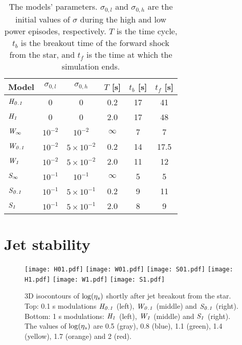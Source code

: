 \documentclass[fleqn,usenatbib]{mnras}
\newcommand{\Ha}{{\it H_{0.1}}}
\newcommand{\Hb}{{\it H_{1}}}
\newcommand{\Wa}{{\it W_{0.1}}}
\newcommand{\Wb}{{\it W_{1}}}
\newcommand{\Sa}{{\it S_{0.1}}}
\newcommand{\Sb}{{\it S_{1}}}
\newcommand{\Wc}{{\it W_{\infty}}}
\newcommand{\Sc}{{\it S_{\infty}}}
\newcommand{\sigl}{{\sigma_{0,l}}}
\newcommand{\sigh}{{\sigma_{0,h}}}
\begin{document}
	\begin{table}
		\setlength{\tabcolsep}{10.5pt}
		\centering
		\begin{tabular}{ | l | c c c c c | }
			
			\hline
			Model & $ \sigl $ & $ \sigh $ & $ T $ [s] & $ t_b $ [s] & $ t_f $ [s] \\ \hline
			
			$ \Ha $ & 0 & 0 & 0.2 & 17 & 41 \\
			$ \Hb $ & 0 & 0 & 2.0 & 17 & 48 \\
			$ \Wc $ & $ 10^{-2} $ & $ 10^{-2} $ & $ \infty $ & 7 & 7 \\
			$ \Wa $ & $ 10^{-2} $ & $ 5\times 10^{-2} $ & 0.2 & 14 & 17.5 \\
			$ \Wb $ & $ 10^{-2} $ & $ 5\times 10^{-2} $ & 2.0 & 11 & 12 \\
			$ \Sc $ & $ 10^{-1} $ & $ 10^{-1} $ & $ \infty $ & 5 & 5 \\
			$ \Sa $ & $ 10^{-1} $ & $ 5\times 10^{-1} $ & 0.2 & 9 & 11 \\
			$ \Sb $ & $ 10^{-1} $ & $ 5\times 10^{-1} $ & 2.0 & 8 & 9 \\
			
			\hline
			
		\end{tabular}
		\hfill\break
		
		\caption{
			The models' parameters. $ \sigl $ and $ \sigh $ are the initial values of $ \sigma $ during the high and low power episodes, respectively. $ T $ is the time cycle, $ t_b $ is the breakout time of the forward shock from the star, and $ t_f $ is the time at which the simulation ends.
		}
		\label{table:models}
	\end{table}
	
	\section{Jet stability}
	\label{sec:stability}
	
	\begin{figure*}
		\centering
		\texttt{[image: H01.pdf]}\hspace{12mm}
		\texttt{[image: W01.pdf]}\hspace{10mm}
		\texttt{[image: S01.pdf]}
		\texttt{[image: H1.pdf]}\hspace{15mm}
		\texttt{[image: W1.pdf]}\hspace{17mm}
		\texttt{[image: S1.pdf]}
		\caption[3D plots]{
			3D isocontours of $ {\rm log}(\eta_s) $ shortly after jet breakout from the star. Top: 0.1 s modulations $ \Ha $ (left), $ \Wa $ (middle) and $ \Sa $ (right). Bottom: 1 s modulations: $ \Hb $ (left), $ \Wb $ (middle) and $ \Sb $ (right).
			The values of $ {\rm log}(\eta_s) $ are 0.5 (gray), 0.8 (blue), 1.1 (green), 1.4 (yellow), 1.7 (orange) and 2 (red).
		}
		\label{fig:3d}
	\end{figure*}
	
\end{document}
